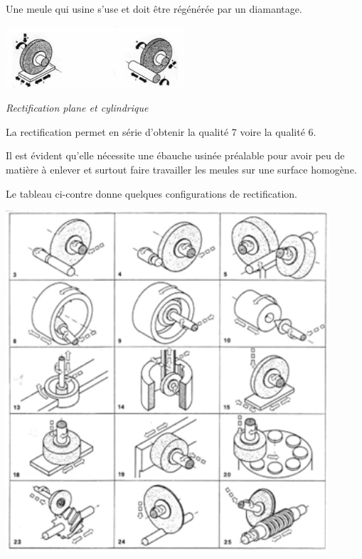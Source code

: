 \documentclass[11pt,oneside]{article}
\begin{document}
Une meule qui usine s'use et doit être régénérée par un diamantage.


\begin{center}
\includegraphics[width=0.5\textwidth]{png/rectif1}

\textit{Rectification plane et cylindrique}
\end{center}

\begin{minipage}[c]{.45\linewidth}
La rectification permet en série d'obtenir la qualité 7 voire la qualité 6. 

Il est évident qu'elle nécessite une ébauche usinée préalable pour avoir peu de matière à enlever et surtout faire travailler les meules sur une surface homogène.

Le tableau ci-contre donne quelques configurations de rectification.


\end{minipage}\hfill
\begin{minipage}[c]{.5\linewidth}
\begin{center}
\includegraphics[width=0.9\textwidth]{png/rectif2}
\end{center}
\end{minipage}
\end{document}
